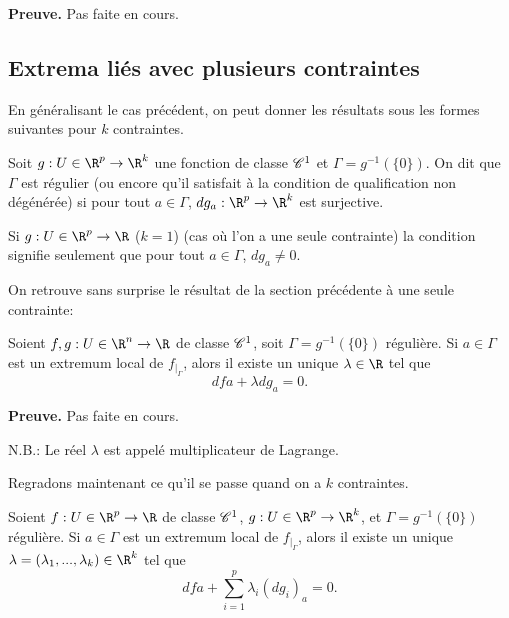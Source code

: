 \documentclass[class=report,crop=false]{standalone}
\begin{document}
{\textbf{Preuve.}} Pas faite en cours.

\subsection{Extrema liés avec plusieurs contraintes}
En généralisant le cas précédent, on peut donner les résultats sous les formes suivantes pour $k$ contraintes.


\begin{definition}
\textcolor[rgb]{0.98,0.00,0.00}{
  Soit $g: U \in \R^p \rightarrow \R^k$ une fonction de classe $\mathscr{C}^1$ et
$\Gamma=g^{-1}(\{0\})$. On dit que $\Gamma$ est r\'egulier (ou encore qu'il satisfait \`a la condition de
qualification non d\'eg\'en\'er\'ee) si pour tout $a \in \Gamma$, $dg_a: \R^p \rightarrow \R^k$ est surjective.}
\end{definition}

\begin{remarque*}
\textcolor[rgb]{0.00,0.00,1.00}{
  Si $g: U \in \R^p \rightarrow \R$ ($k=1$) (cas où l'on a une seule contrainte) la condition signifie seulement que pour tout $a \in \Gamma$,
$dg_a \neq 0$.}
\end{remarque*}

\noindent On retrouve sans surprise le résultat de la section précédente à une seule contrainte:

\begin{theoreme}
\textcolor[rgb]{0.44,0.00,0.87}{
  Soient $f,g: U \in \R^n \rightarrow \R$ de classe $\mathscr{C}^1$, soit $\Gamma=g^{-1}(\{0\})$ r\'eguli\`ere. Si $a \in \Gamma$
est un extremum local de  $f_{\mid _\Gamma}$, alors il existe un unique $\lambda \in \R$ tel que
\begin{equation*}
  dfa + \lambda dg_a=0.
\end{equation*}}
\end{theoreme}

{\textbf{Preuve.}} Pas faite en cours.

N.B.: Le r\'eel $\lambda$ est appel\'e multiplicateur de Lagrange.

\noindent Regradons maintenant ce qu'il se passe quand on a $k$ contraintes. 

\begin{theoreme}
\textcolor[rgb]{0.44,0.00,0.87}{
  Soient $f: U \in \R^p \rightarrow \R$ de classe $\mathscr{C}^1$, $g: U \in\R^p \rightarrow \R^k$,  et $\Gamma=g^{-1}(\{0\})$ r\'eguli\`ere. Si $a \in \Gamma$
est un extremum local de  $f_{\mid _\Gamma}$, alors il existe un unique $\lambda=(\lambda_1,...,\lambda_k) \in \R^k$ tel que
\begin{equation*}
  dfa + \displaystyle \sum_{i=1}^p \lambda_i (dg_i)_a=0.
\end{equation*}}
\end{theoreme}
\end{document}

